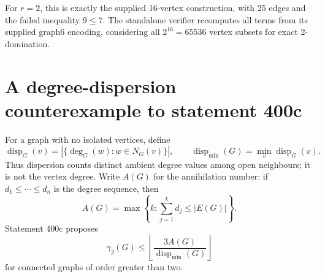 \documentclass[11pt,a4paper]{article}
\theoremstyle{remark}
\begin{document}
For $r=2$, this is exactly the supplied 16-vertex construction, with
25 edges and the failed inequality $9\le7$. The standalone verifier
recomputes all terms from its supplied graph6 encoding, considering all
$2^{16}=65536$ vertex subsets for exact 2-domination.

\section{A degree-dispersion counterexample to statement 400c}
\label{r5:sec400c}

For a graph with no isolated vertices, define
\[
\operatorname{disp}_G(v)
   =|\{\deg_G(w):w\in N_G(v)\}|,\qquad
\operatorname{disp}_{\min}(G)=\min_v\operatorname{disp}_G(v).
\]
Thus dispersion counts distinct ambient degree values among open
neighbours; it is not the vertex degree. Write \(A(G)\) for the
annihilation number: if \(d_1\le\cdots\le d_n\) is the degree
sequence, then
\[
A(G)=\max\left\{k:\sum_{j=1}^k d_j\le |E(G)|\right\}.
\]
Statement 400c \cite{WOWII} proposes
\begin{equation}\label{r5:eq400c}
\gamma_2(G)\le
\left\lfloor\frac{3A(G)}{\operatorname{disp}_{\min}(G)}\right\rfloor
\end{equation}
for connected graphs of order greater than two.
\end{document}
